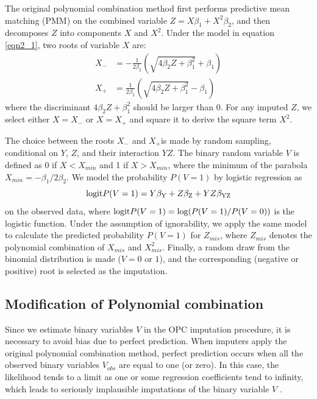 	The original polynomial combination method first performs predictive mean matching (PMM) \citep{little1988missing} on the combined variable $Z = X\beta_{1} + X^2\beta_{2}$, and then decomposes $Z$ into components $X$ and $X^2$. Under the model in equation \ref{eqn2_1}, two roots of variable $X$ are:
	\begin{equation}
		\begin{array}{ll}
			X_{-} &= -\frac{1}{2\beta_{2}}(\sqrt{4\beta_{2}Z + \beta_{1}^2} + \beta_{1})\\
			X_{+} &= \frac{1}{2\beta_{2}}(\sqrt{4\beta_{2}Z + \beta_{1}^2} - \beta_{1})
		\end{array}
	\end{equation} 
	where the discriminant $4\beta_{2}Z + \beta_{1}^2$ should be larger than 0. For any imputed $Z$, we select either $X = X_{-}$ or $X = X_{+}$ and square it to derive the square term $X^2$. 

	The choice between the roots $X_{-}$ and $X_{+}$is made by random sampling, conditional on $Y$, $Z$, and their interaction $YZ$. The binary random variable $V$ is defined as 0 if $X < X_{min}$ and 1 if $X > X_{min}$, where the minimum of the parabola $X_{min} = -\beta_{1}/2\beta_{2}$. We model the probability $P(V = 1)$ by logistic regression as
	\begin{equation}
		\textnormal{logit} P(V = 1) = Y\beta_{\textnormal{Y}} + Z\beta_{\textnormal{Z}} + YZ\beta_{\textnormal{YZ}}
	\end{equation} 
	on the observed data, where $\textnormal{logit} P(V = 1) = \textnormal{log}(P(V = 1) / P(V = 0))$ is the logistic function. Under the assumption of ignorability, we apply the same model to calculate the predicted probability $P(V = 1)$ for $Z_{mis}$, where $Z_{mis}$ denotes the polynomial combination of $X_{mis}$ and $X_{mis}^{2}$. Finally, a random draw from the binomial distribution is made ($V = 0$ \textnormal{or} $1$), and the corresponding (negative or positive) root is selected as the imputation. 
  
	\subsection{Modification of Polynomial combination}
	Since we estimate binary variables $V$ in the OPC imputation procedure, it is necessary to avoid bias due to perfect prediction. When imputers apply the original polynomial combination method, perfect prediction occurs when all the observed binary variables $V_{obs}$ are equal to one (or zero). In this case, the likelihood tends to a limit as one or some regression coefficients tend to infinity, which leads to seriously implausible imputations of the binary variable $V$ \citep{white2010avoiding}. 
	
